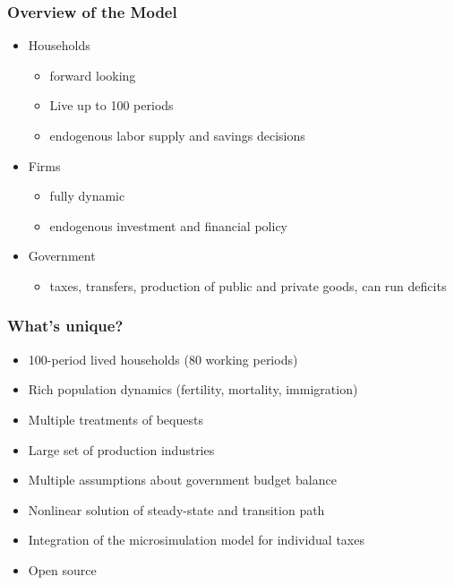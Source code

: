 \documentclass{beamer}
\begin{document}
  \begin{frame}
    \frametitle{Overview of the Model}
    \begin{itemize}
      \item Households
        \begin{itemize}
          \item forward looking
          \item Live up to 100 periods
          \item endogenous labor supply and savings decisions
        \end{itemize}
      \vspace{3mm}
      \item Firms
        \begin{itemize}
          \item fully dynamic
          \item endogenous investment and financial policy
        \end{itemize}
      \vspace{3mm}
      \item Government
        \begin{itemize}
          \item taxes, transfers, production of public and private goods, can run deficits
        \end{itemize}
    \end{itemize}
  \end{frame}


  \begin{frame}
    \frametitle{What's unique?}
    \begin{itemize}
      \item 100-period lived households (80 working periods)
      \vspace{2mm}
      \item Rich population dynamics (fertility, mortality, immigration)
      \vspace{2mm}
      \item Multiple treatments of bequests
      \vspace{2mm}
      \item Large set of production industries
      \vspace{2mm}
      \item Multiple assumptions about government budget balance
      \vspace{2mm}
      \item Nonlinear solution of steady-state and transition path
      \vspace{2mm}
      \item Integration of the microsimulation model for individual taxes
      \vspace{2mm}
      \item Open source
    \end{itemize}
  \end{frame}
\end{document}
